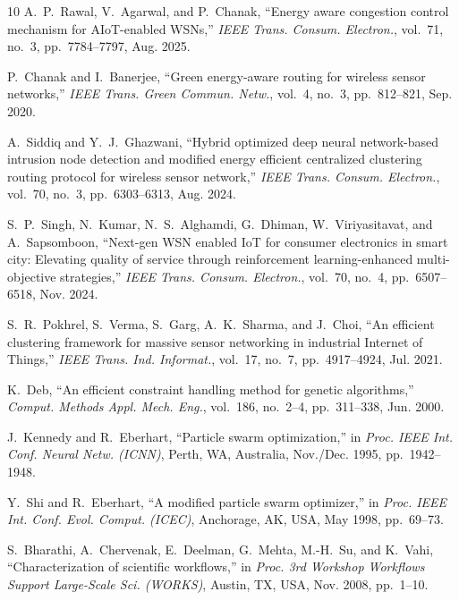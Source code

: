 \documentclass[journal]{IEEEtran}
\begin{document}
\begin{thebibliography}{10}
A.~P.~Rawal, V.~Agarwal, and P.~Chanak, ``Energy aware congestion control mechanism for AIoT-enabled WSNs,'' \textit{IEEE Trans. Consum. Electron.}, vol.~71, no.~3, pp.~7784--7797, Aug. 2025.

P.~Chanak and I.~Banerjee, ``Green energy-aware routing for wireless sensor networks,'' \textit{IEEE Trans. Green Commun. Netw.}, vol.~4, no.~3, pp.~812--821, Sep. 2020.

A.~Siddiq and Y.~J.~Ghazwani, ``Hybrid optimized deep neural network-based intrusion node detection and modified energy efficient centralized clustering routing protocol for wireless sensor network,'' \textit{IEEE Trans. Consum. Electron.}, vol.~70, no.~3, pp.~6303--6313, Aug. 2024.

S.~P.~Singh, N.~Kumar, N.~S.~Alghamdi, G.~Dhiman, W.~Viriyasitavat, and A.~Sapsomboon, ``Next-gen WSN enabled IoT for consumer electronics in smart city: Elevating quality of service through reinforcement learning-enhanced multi-objective strategies,'' \textit{IEEE Trans. Consum. Electron.}, vol.~70, no.~4, pp.~6507--6518, Nov. 2024.

S.~R.~Pokhrel, S.~Verma, S.~Garg, A.~K.~Sharma, and J.~Choi, ``An efficient clustering framework for massive sensor networking in industrial Internet of Things,'' \textit{IEEE Trans. Ind. Informat.}, vol.~17, no.~7, pp.~4917--4924, Jul. 2021.

K.~Deb, ``An efficient constraint handling method for genetic algorithms,'' \textit{Comput. Methods Appl. Mech. Eng.}, vol.~186, no.~2--4, pp.~311--338, Jun. 2000.

J.~Kennedy and R.~Eberhart, ``Particle swarm optimization,'' in \textit{Proc. IEEE Int. Conf. Neural Netw. (ICNN)}, Perth, WA, Australia, Nov./Dec. 1995, pp.~1942--1948.

Y.~Shi and R.~Eberhart, ``A modified particle swarm optimizer,'' in \textit{Proc. IEEE Int. Conf. Evol. Comput. (ICEC)}, Anchorage, AK, USA, May 1998, pp.~69--73.

S.~Bharathi, A.~Chervenak, E.~Deelman, G.~Mehta, M.-H.~Su, and K.~Vahi, ``Characterization of scientific workflows,'' in \textit{Proc. 3rd Workshop Workflows Support Large-Scale Sci. (WORKS)}, Austin, TX, USA, Nov. 2008, pp.~1--10.

\end{thebibliography}
\end{document}
